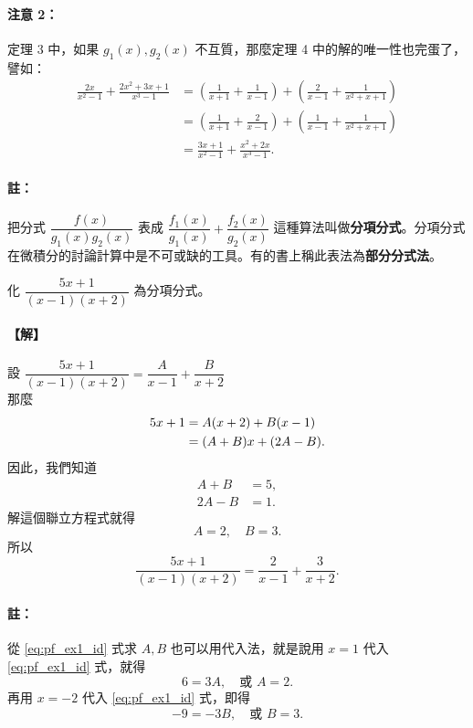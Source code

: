 \paragraph{注意 2：}
定理 3 中，如果 $g_1(x), g_2(x)$ 不互質，那麼定理 4 中的解的唯一性也完蛋了，譬如：
\begin{align*}
  \frac{2x}{x^2-1} + \frac{2x^2+3x+1}{x^3-1} &= \left(\frac{1}{x+1}+\frac{1}{x-1}\right) + \left(\frac{2}{x-1}+\frac{1}{x^2+x+1}\right) \\
  &= \left(\frac{1}{x+1}+\frac{2}{x-1}\right) + \left(\frac{1}{x-1}+\frac{1}{x^2+x+1}\right) \\
  &= \frac{3x+1}{x^2-1} + \frac{x^2+2x}{x^3-1}.
\end{align*}

\paragraph{註：}
把分式 $\dfrac{f(x)}{g_1(x)g_2(x)}$ 表成 $\dfrac{f_1(x)}{g_1(x)} + \dfrac{f_2(x)}{g_2(x)}$ 這種算法叫做\textbf{分項分式}。分項分式在微積分的討論計算中是不可或缺的工具。有的書上稱此表法為\textbf{部分分式法}。

\begin{example}\label{ex:7-3-5}
化 $\dfrac{5x+1}{(x-1)(x+2)}$ 為分項分式。

\paragraph{【解】}
設 $\dfrac{5x+1}{(x-1)(x+2)} = \dfrac{A}{x-1} + \dfrac{B}{x+2}$\\
那麼
\begin{align}
  5x+1 &= A(x+2)+B(x-1) \label{eq:pf_ex1_id} \\
  &= (A+B)x+(2A-B). \notag
\end{align}
因此，我們知道
\begin{align*}
  A+B &= 5, \\
  2A-B &= 1.
\end{align*}
解這個聯立方程式就得
\begin{equation*}
  A=2, \quad B=3.
\end{equation*}
所以
\begin{equation*}
  \frac{5x+1}{(x-1)(x+2)} = \frac{2}{x-1} + \frac{3}{x+2}.
\end{equation*}
\end{example}

\paragraph{註：}
從 \eqref{eq:pf_ex1_id} 式求 $A, B$ 也可以用代入法，就是說用 $x=1$ 代入 \eqref{eq:pf_ex1_id} 式，就得
\begin{equation*}
  6 = 3A, \quad \text{或 } A=2.
\end{equation*}
再用 $x=-2$ 代入 \eqref{eq:pf_ex1_id} 式，即得
\begin{equation*}
  -9 = -3B, \quad \text{或 } B=3.
\end{equation*}

